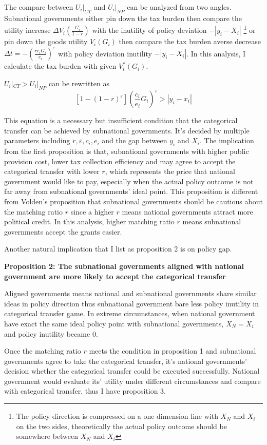 \begin{itemize}
The compare between $U_i|_{CT}$ and $U_i|_{NP}$ can be analyzed from two angles. Subnational governments either pin down the tax burden then compare the utility increase $\Delta V_i(\frac{G_i}{1-r})$ with the inutility of policy deviation $-|y_i-X_i|$ \footnote[1]{The policy direction is compressed on a one dimension line with $X_N$ and $X_i$ on the two sides, theoretically the actual policy outcome should be somewhere between $X_N$ and $X_i$} or pin down the goods utility $V_i(G_i)$ then compare the tax burden averse decrease $\Delta t=-(\frac{r c_i G_i}{e_i})^\varepsilon$ with policy deviation inutility $-|y_i-X_i|$. In this analysis, I calculate the tax burden with given $V_i^*(G_i)$.

$U_i|_{CT} > U_i|_{NP}$ can be rewritten as $$[1-(1-r)^\varepsilon]( \frac{c_i}{e_i}G_i)^\varepsilon > |y_i-x_i|$$

This equation is a necessary but insufficient condition that the categorical transfer can be achieved by subnational governments. It's decided by multiple parameters including $r,\varepsilon,c_i,e_i$ and the gap between $y_i$ and $X_i$. The implication from the first proposition is that, subnational governments with higher public provision cost, lower tax collection efficiency and may agree to accept the categorical transfer with lower $r$, which represents the price that national government would like to pay, especially when the actual policy outcome is not far away from subnational governments' ideal point. This proposition is different from Volden's proposition that subnational governments should be cautious about the matching ratio $r$ since a higher $r$ means national governments attract more political credit. In this analysis, higher matching ratio $r$ means subnational governments accept the grants easier.

Another natural implication that I list as proposition 2 is on policy gap.


\textbf{Proposition 2: The subnational governments aligned with national government are more likely to accept the categorical transfer}

Aligned governments means national and subnational governments share similar ideas in policy direction thus subnational government bare less policy inutility in categorical transfer game. In extreme circumstances, when national government have exact the same ideal policy point with subnational governments, $X_N = X_i$ and policy inutility became 0.

Once the matching ratio $r$ meets the condition in proposition 1 and subnational governments agree to take the categorical transfer, it's national governments' decision whether the categorical transfer could be executed successfully. National government would evaluate its' utility under different circumstances and compare with categorical transfer, thus I have proposition 3.


\end{itemize}
